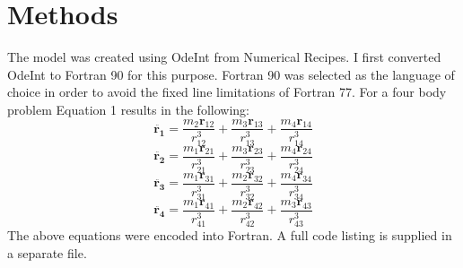 \documentclass[a4paper,12pt]{article}
\begin{document}
\section{Methods}
The model was created using OdeInt from Numerical Recipes. I first converted OdeInt to Fortran 90 for this purpose.
Fortran 90 was selected as the language of choice in order to avoid the fixed line limitations of Fortran 77.
For a four body problem Equation 1 results in the following:
\begin{equation}
\ddot{\mathbf{r_1}}=\frac{m_2\mathbf{r}_{12}}{r^3_{12}}+\frac{m_3\mathbf{r}_{13}}{r^3_{13}}+\frac{m_4\mathbf{r}_{14}}{r^3_{14}}
\end{equation}
\begin{equation}
\ddot{\mathbf{r_2}}=\frac{m_1\mathbf{r}_{21}}{r^3_{21}}+\frac{m_3\mathbf{r}_{23}}{r^3_{23}}+\frac{m_4\mathbf{r}_{24}}{r^3_{24}}
\end{equation}
\begin{equation}
\ddot{\mathbf{r_3}}=\frac{m_1\mathbf{r}_{31}}{r^3_{31}}+\frac{m_2\mathbf{r}_{32}}{r^3_{32}}+\frac{m_4\mathbf{r}_{34}}{r^3_{34}}
\end{equation}
\begin{equation}
\ddot{\mathbf{r_4}}=\frac{m_1\mathbf{r}_{41}}{r^3_{41}}+\frac{m_2\mathbf{r}_{42}}{r^3_{42}}+\frac{m_3\mathbf{r}_{43}}{r^3_{43}}
\end{equation}
The above equations were encoded into Fortran. A full code listing is supplied in a separate file.
\end{document}
